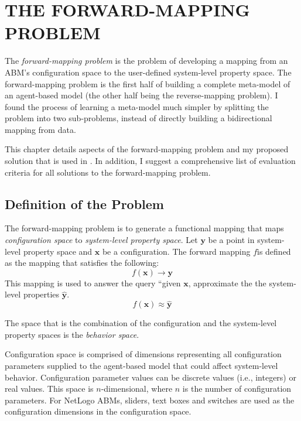 \chapter{THE FORWARD-MAPPING PROBLEM}
\thispagestyle{plain}

\label{ForwardMapping}

The \textit{forward-mapping problem} is the problem of developing a mapping from an ABM's configuration space to the user-defined system-level property space.
The forward-mapping problem is the first half of building a complete meta-model of an agent-based model (the other half being the reverse-mapping problem).
I found the process of learning a meta-model much simpler by splitting the problem into two sub-problems, instead of directly building a bidirectional mapping from data.

This chapter details aspects of the forward-mapping problem and my proposed solution that is used in \fw.
In addition, I suggest a comprehensive list of evaluation criteria for all solutions to the forward-mapping problem.

\section{Definition of the Problem}
The forward-mapping problem is to generate a functional mapping that maps \textit{configuration space} to \textit{system-level property space}.
Let $\mathbf{y}$ be a point in system-level property space and $\mathbf x$ be a configuration.
The forward mapping $f$is defined as the mapping that satisfies the following:
\[ f(\mathbf x) \rightarrow \mathbf{y} \]
This mapping is used to answer the query ``given $\mathbf x$, approximate the the system-level properties  $\hat{\mathbf y}$.
\[ f(\mathbf x) \approx \hat{\mathbf y} \]

The space that is the combination of the configuration and the system-level property spaces is the \textit{behavior space}.

Configuration space is comprised of dimensions representing all configuration parameters supplied to the agent-based model that could affect system-level behavior.
Configuration parameter values can be discrete values (i.e., integers) or real values.
This space is $n$-dimensional, where $n$ is the number of configuration parameters.
For NetLogo ABMs, sliders, text boxes and switches are used as the configuration dimensions in the configuration space.


